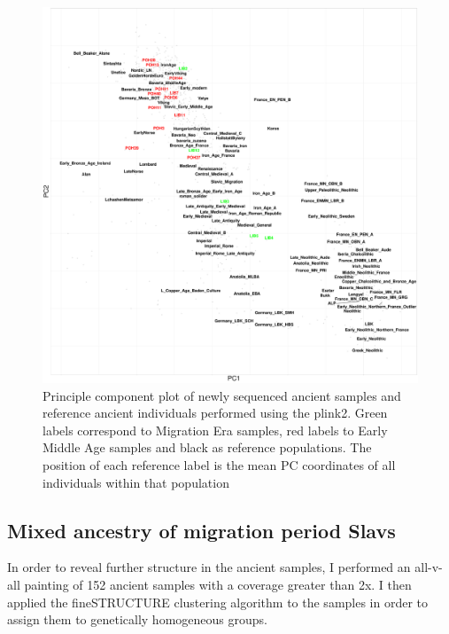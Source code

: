 \begin{figure}[htp]
    \centering
    \includegraphics[width=1.0\textwidth]{../images/chapter5/plink_pca.pdf}
    \caption{Principle component plot of newly sequenced ancient samples and reference ancient individuals performed using the plink2. Green labels correspond to Migration Era samples, red labels to Early Middle Age samples and black as reference populations. The position of each reference label is the mean PC coordinates of all individuals within that population}
    \label{fig:AllChr.plink_PCA}
\end{figure}


\subsection{Mixed ancestry of migration period Slavs}

In order to reveal further structure in the ancient samples, I performed an all-v-all painting of 152 ancient samples with a coverage greater than 2x.  I then applied the fineSTRUCTURE clustering algorithm to the samples in order to assign them to genetically homogeneous groups.

